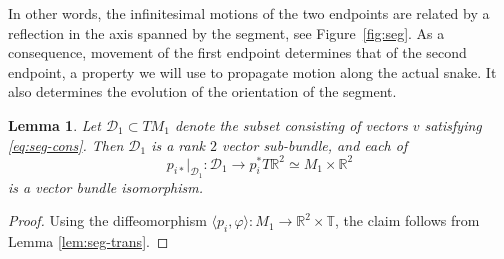 \documentclass{article}
\def\sD{\mathcal{D}}
\def\RR{\mathbb{R}}
\def\TT{\mathbb{T}}
\newtheorem{lem}{Lemma}
\theoremstyle{definition}
\begin{document}
In other words, the infinitesimal motions of the two endpoints
are related by a reflection in the axis spanned by the segment,
see Figure~\ref{fig:seg}. As a consequence, movement of the first endpoint 
determines that of the second endpoint, a property we will use to
propagate motion along the actual snake. 
It also determines the evolution of the orientation of the segment.
\begin{lem}\label{lem:seg-iso}
Let $\sD_1 \subset TM_1$
denote the subset consisting of vectors $v$ satisfying
\eqref{eq:seg-cons}. Then $\sD_1$ is a rank $2$ vector
sub-bundle, and each of $$p_{i*}|_{\sD_1} : \sD_1 \to p_i^* T\RR^2 \simeq
M_1\times\RR^2$$ is a vector bundle isomorphism.
\end{lem}
\begin{proof}
        Using the diffeomorphism $\langle p_i,\varphi\rangle : M_1 \to \RR^2\times\TT$,
        the claim follows from Lemma \ref{lem:seg-trans}.
\end{proof}
\end{document}
